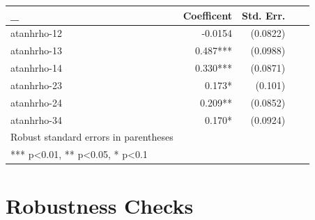 \documentclass[
]{article}
\begin{document}
\begin{landscape}
\begin{ThreePartTable}
\begin{longtable}[t]{lrrrr}
\midrule
\_ & Coefficent & Std. Err. &  & \\
\midrule
atanhrho-12 & -0.0154 & (0.0822) &  & \\
atanhrho-13 & 0.487*** & (0.0988) &  & \\
atanhrho-14 & 0.330*** & (0.0871) &  & \\
atanhrho-23 & 0.173* & (0.101) &  & \\
atanhrho-24 & 0.209** & (0.0852) &  & \\
atanhrho-34 & 0.170* & (0.0924) &  & \\
\midrule
Robust standard errors in parentheses &  &  &  & \\
*** p<0.01, ** p<0.05, * p<0.1 &  &  &  & \\*
\end{longtable}
\end{ThreePartTable}
\endgroup{}
\end{landscape}

\hypertarget{robustness-checks}{%
\section{Robustness Checks}\label{robustness-checks}}

\newpage
\end{document}
